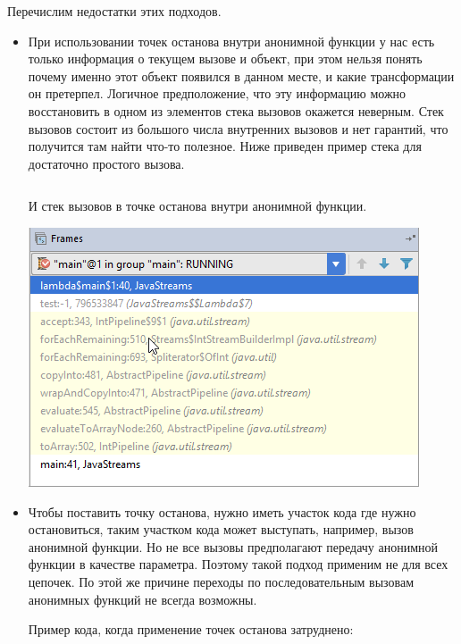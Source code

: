 Перечислим недостатки этих подходов.
\begin{itemize}
	\item При использовании точек останова внутри анонимной функции у нас есть только информация о текущем вызове и объект, при этом нельзя понять почему именно этот объект появился в данном месте, и какие трансформации он претерпел. Логичное предположение, что эту информацию можно восстановить в одном из элементов стека вызовов окажется неверным. Стек вызовов состоит из большого числа внутренних вызовов и нет гарантий, что получится там найти что-то полезное. Ниже приведен пример стека для достаточно простого вызова.
	\inputminted{java}{chapter1/code/SimplestStreamExample.java}
	
	И стек вызовов в точке останова внутри анонимной функции.
	
	\includegraphics[scale=1.]{chapter1/img/stack.png}
	
	\item Чтобы поставить точку останова, нужно иметь участок кода где нужно остановиться, таким участком кода может выступать, например, вызов анонимной функции. Но не все вызовы предполагают передачу анонимной функции в качестве параметра. Поэтому такой подход применим не для всех цепочек. По этой же причине переходы по последовательным вызовам анонимных функций не всегда возможны.
	
	Пример кода, когда применение точек останова затруднено: \inputminted{java}{chapter1/code/HardToUseBreakpoint.java}
\end{itemize}

